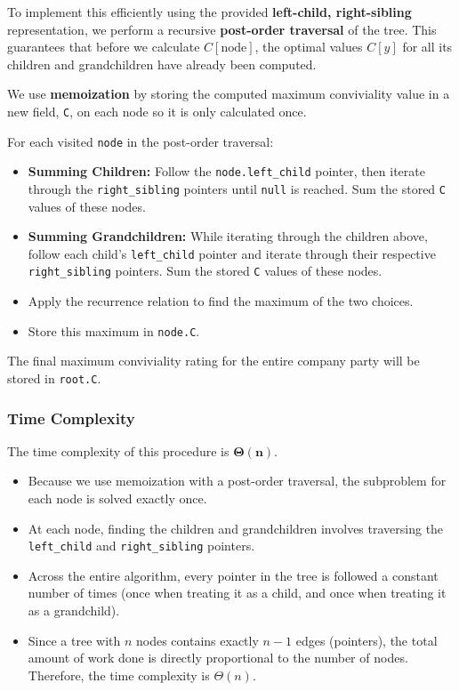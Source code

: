 To implement this efficiently using the provided \textbf{left-child,
right-sibling} representation, we perform a recursive \textbf{post-order
traversal} of the tree. This guarantees that before we calculate
$C[\text{node}]$, the optimal values $C[y]$ for all its children and
grandchildren have already been computed. 

We use \textbf{memoization} by storing the computed maximum conviviality value
in a new field, \texttt{C}, on each node so it is only calculated once.

For each visited \texttt{node} in the post-order traversal:
\begin{itemize}
    \item \textbf{Summing Children:} Follow the \texttt{node.left\_child}
    pointer, then iterate through the \texttt{right\_sibling} pointers until
    \texttt{null} is reached. Sum the stored \texttt{C} values of these nodes.

    \item \textbf{Summing Grandchildren:} While iterating through the children
    above, follow each child's \texttt{left\_child} pointer and iterate through
    their respective \texttt{right\_sibling} pointers. Sum the stored \texttt{C}
    values of these nodes.

    \item Apply the recurrence relation to find the maximum of the two choices.
    
    \item Store this maximum in \texttt{node.C}.
\end{itemize}
The final maximum conviviality rating for the entire company party will be
stored in \texttt{root.C}.


\subsubsection*{Time Complexity}
The time complexity of this procedure is $\mathbf{\Theta(n)}$.

\begin{itemize}
    \item Because we use memoization with a post-order traversal, the subproblem
    for each node is solved exactly once.

    \item At each node, finding the children and grandchildren involves
    traversing the \texttt{left\_child} and \texttt{right\_sibling} pointers. 

    \item Across the entire algorithm, every pointer in the tree is followed a
    constant number of times (once when treating it as a child, and once when
    treating it as a grandchild). 

    \item Since a tree with $n$ nodes contains exactly $n-1$ edges (pointers),
    the total amount of work done is directly proportional to the number of
    nodes. Therefore, the time complexity is $\Theta(n)$.
\end{itemize}
